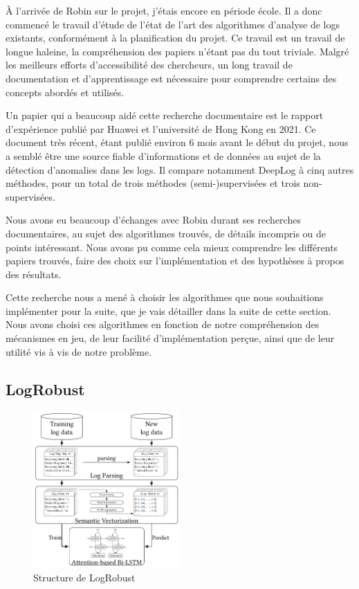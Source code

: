 \documentclass[openany, 11pt]{memoir}
\begin{document}
À l'arrivée de Robin sur le projet, j'étais encore en période école. Il a donc commencé le travail d'étude de l'état de l'art des algorithmes d'analyse de \glspl{log} existants, conformément à la planification du projet. Ce travail est un travail de longue haleine, la compréhension des papiers n'étant pas du tout triviale. Malgré les meilleurs efforts d'accessibilité des chercheurs, un long travail de documentation et d'apprentissage est nécessaire pour comprendre certains des concepts abordés et utilisés.

Un papier qui a beaucoup aidé cette recherche documentaire est le rapport d'expérience \cite{experiencereport} publié par Huawei et l'université de Hong Kong en 2021. Ce document très récent, étant publié environ 6 mois avant le début du projet, nous a semblé être une source fiable d'informations et de données au sujet de la détection d'anomalies dans les logs. Il compare notamment DeepLog à cinq autres méthodes, pour un total de trois méthodes (semi-)supervisées et trois non-supervisées.

Nous avons eu beaucoup d'échanges avec Robin durant ses recherches documentaires, au sujet des algorithmes trouvés, de détails incompris ou de points intéressant. Nous avons pu comme cela mieux comprendre les différents papiers trouvés, faire des choix sur l'implémentation et des hypothèses à propos des résultats.

\bigskip
Cette recherche nous a mené à choisir les algorithmes que nous souhaitions implémenter pour la suite, que je vais détailler dans la suite de cette section. Nous avons choisi ces algorithmes en fonction de notre compréhension des mécanismes en jeu, de leur facilité d'implémentation perçue, ainsi que de leur utilité vis à vis de notre problème.

\subsection{LogRobust}

\begin{figure}[ht]
	\centering
	\includegraphics[width=0.5\textwidth]{images/logrobust.png}
	\caption{Structure de LogRobust}
	\label{logrobust}
\end{figure}
\end{document}
